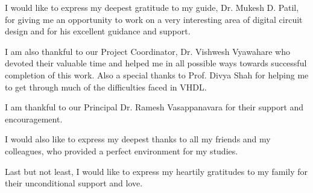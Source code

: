 %
%
%
%
%
%
%



\begin{acknowledgments}
I would like to express my deepest gratitude to my guide, Dr. Mukesh D. Patil, for giving me an opportunity to work on a very interesting area of digital circuit design and for his excellent guidance and support.

I am also thankful to our Project Coordinator, Dr. Vishwesh Vyawahare  who devoted their valuable time and helped me in all possible ways towards successful completion of this work. Also a special thanks to Prof. Divya Shah for helping me to get through much of the difficulties faced in
VHDL.%

I am thankful to our Principal Dr. Ramesh Vasappanavara  for their support and encouragement.

I would also like to express my deepest thanks to all my friends and my colleagues, who provided a perfect environment for my studies.

Last but not least, I would like to express my heartily gratitudes to my family for their unconditional support and love.
\end{acknowledgments}

